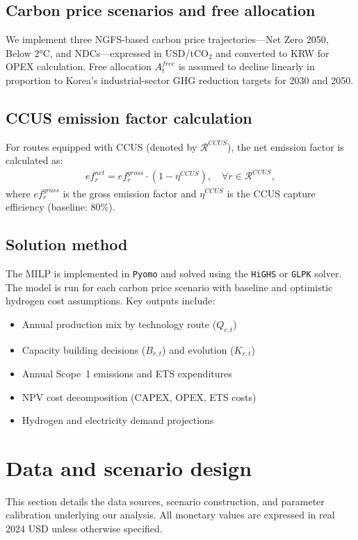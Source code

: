 \documentclass[preprint,1p,authoryear]{elsarticle}
\begin{document}
\subsection{Carbon price scenarios and free allocation}
We implement three NGFS-based carbon price trajectories—Net Zero 2050, Below 2°C, and NDCs—expressed in USD/tCO$_2$ and converted to KRW for OPEX calculation. Free allocation $A^{free}_t$ is assumed to decline linearly in proportion to Korea's industrial-sector GHG reduction targets for 2030 and 2050.

\subsection{CCUS emission factor calculation}
For routes equipped with CCUS (denoted by $\mathcal{R}^{CCUS}$), the net emission factor is calculated as:
\begin{align}
ef_r^{net} = ef_r^{gross} \cdot (1 - \eta^{CCUS}), \quad \forall r \in \mathcal{R}^{CCUS},
\end{align}
where $ef_r^{gross}$ is the gross emission factor and $\eta^{CCUS}$ is the CCUS capture efficiency (baseline: 80\%).

\subsection{Solution method}
The MILP is implemented in \texttt{Pyomo} and solved using the \texttt{HiGHS} or \texttt{GLPK} solver. The model is run for each carbon price scenario with baseline and optimistic hydrogen cost assumptions. Key outputs include:
\begin{itemize}[leftmargin=*]
  \item Annual production mix by technology route ($Q_{r,t}$)
  \item Capacity building decisions ($B_{r,t}$) and evolution ($K_{r,t}$)
  \item Annual Scope~1 emissions and ETS expenditures
  \item NPV cost decomposition (CAPEX, OPEX, ETS costs)
  \item Hydrogen and electricity demand projections
\end{itemize}

\section{Data and scenario design}

This section details the data sources, scenario construction, and parameter calibration underlying our analysis. All monetary values are expressed in real 2024 USD unless otherwise specified.
\end{document}
